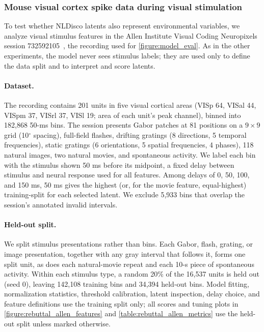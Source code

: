 \subsubsection{Mouse visual cortex spike data during visual stimulation}
\label{subsubsection:rebuttal_allen_stimulus_features}

To test whether NLDisco latents also represent environmental variables, we analyze visual stimulus features in the Allen Institute Visual Coding Neuropixels session 732592105~\citep{siegle_2021_allen_datasets}, the recording used for \autoref{figure:model_eval}. As in the other experiments, the model never sees stimulus labels; they are used only to define the data split and to interpret and score latents.

\paragraph{Dataset.}
The recording contains 201 units in five visual cortical areas (VISp 64, VISal 44, VISpm 37, VISrl 37, VISl 19; area of each unit's peak channel), binned into 182,868 50-ms bins. The session presents Gabor patches at 81 positions on a $9\times9$ grid (10$^\circ$ spacing), full-field flashes, drifting gratings (8 directions, 5 temporal frequencies), static gratings (6 orientations, 5 spatial frequencies, 4 phases), 118 natural images, two natural movies, and spontaneous activity. We label each bin with the stimulus shown 50 ms before its midpoint, a fixed delay between stimulus and neural response used for all features. Among delays of 0, 50, 100, and 150 ms, 50 ms gives the highest (or, for the movie feature, equal-highest) training-split  for each selected latent. We exclude 5,933 bins that overlap the session's annotated invalid intervals.

\paragraph{Held-out split.}
We split stimulus presentations rather than bins. Each Gabor, flash, grating, or image presentation, together with any gray interval that follows it, forms one split unit, as does each natural-movie repeat and each 10-s piece of spontaneous activity. Within each stimulus type, a random 20\% of the 16,537 units is held out (seed 0), leaving 142,108 training bins and 34,394 held-out bins. Model fitting, normalization statistics, threshold calibration, latent inspection, delay choice, and feature definitions use the training split only; all scores and tuning plots in \autoref{figure:rebuttal_allen_features} and \autoref{table:rebuttal_allen_metrics} use the held-out split unless marked otherwise.

